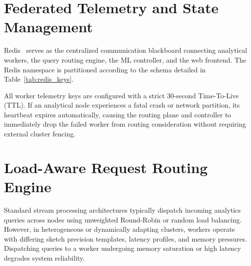 \section{Federated Telemetry and State Management}

Redis~\cite{redis} serves as the centralized communication blackboard connecting analytical workers, the query routing engine, the ML controller, and the web frontend. The Redis namespace is partitioned according to the schema detailed in Table~\ref{tab:redis_keys}.

\begin{table}[htbp]
\centering
{}
\caption{Redis telemetry and command key schema.}
\label{tab:redis_keys}
\end{table}

All worker telemetry keys are configured with a strict 30-second Time-To-Live (TTL). If an analytical node experiences a fatal crash or network partition, its heartbeat expires automatically, causing the routing plane and controller to immediately drop the failed worker from routing consideration without requiring external cluster fencing.

\section{Load-Aware Request Routing Engine}

Standard stream processing architectures typically dispatch incoming analytics queries across nodes using unweighted Round-Robin or random load balancing. However, in heterogeneous or dynamically adapting clusters, workers operate with differing sketch precision templates, latency profiles, and memory pressures. Dispatching queries to a worker undergoing memory saturation or high latency degrades system reliability.

